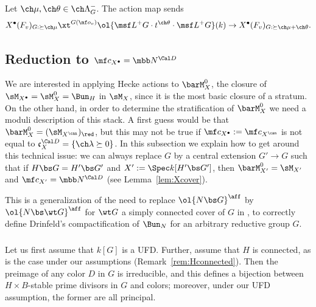 \begin{lem}
\notready \label{lem:act-kpoints}
Let $\ch\mu,\ch\theta \in \ch\Lambda^-_G$.
The action map sends
\[
    X^\bullet(F_v)_{G:\succeq \ch\mu} \xt^{G(\mf o_v)} \ol{\msf L^+G \cdot t^{\ch\theta} \cdot \msf L^+G}(k) \to X^\bullet(F_v)_{G:\succeq \ch\mu+ \ch\theta}.
\]
\end{lem}


\subsection{Reduction to $\mf c_{X^\bullet} = \mbb N^{\Cal D}$} \label{sect:freemonoid}
We are interested in applying Hecke actions to $\barM_X^0$, the closure of $\sM_{X^\bullet}=\sM_X^0=\Bun_H$ in $\sM_X$, since it is the most basic closure of a stratum.
On the other hand, in order to determine the stratification of $\barM_X^0$ we
need a moduli description of this stack. A first guess would be
that $\barM_X^0 = (\sM_{X^\can})_\red$, but this may not be true if $\mf c_{X^\bullet} := \mf c_{X^\can}$
is not equal to $\mathfrak c_X^{\Cal D} = \{\ch\lambda\succeq 0\}$.
In this subsection we explain how to get around this technical issue:
we can always replace $G$ by a central extension $G'\to G$ such that if
$H\bs G = H'\bs G'$ and $X' := \Spec k[H'\bs G']$, then
$\barM_{X'}^0 = \sM_{X'}$ and $\mf c_{X'} = \mbb N^{\Cal D}$ (see Lemma~\ref{lem:Xcover}).



This is a generalization of the need to replace $\ol{N\bs G}^\aff$ by
$\ol{N\bs \wt G}^\aff$ for $\wt G$ a simply connected cover of $G$
in \cite[\S 4.1]{ABB}, \cite[\S 7.2]{Sch}
to correctly define Drinfeld's compactification of $\Bun_N$
for an arbitrary reductive group $G$.

\subsubsection{}

Let us first assume that $k[G]$ is a UFD. Further, assume that $H$ is connected, as is the case under our assumptions (Remark~\ref{rem:Hconnected}).
Then the preimage of any color $D$ in $G$ is irreducible, and this defines
a bijection between $H\times B$-stable prime divisors in $G$ and colors; moreover, under our UFD assumption, the former are all principal.

